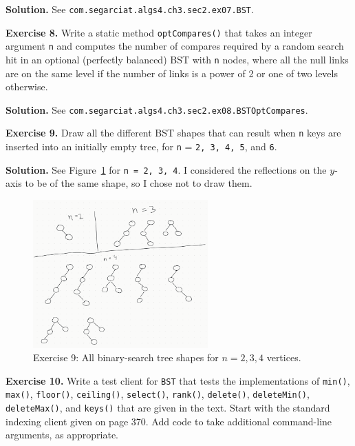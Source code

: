 \documentclass[12pt, a4paper]{article}
\newenvironment{ex}[2][Exercise]
{\par\medskip\noindent \textbf{#1 #2.}}
{\medskip}
\newenvironment{sol}[1][Solution]
{\par\medskip\noindent \textbf{#1.} }
{\medskip}
\begin{document}
	\begin{sol}
		See \texttt{com.segarciat.algs4.ch3.sec2.ex07.BST}.
	\end{sol}
	\begin{ex}{8}
		Write a static method \texttt{optCompares()} that takes an integer argument \texttt{n}
		and computes the number of compares required by a random search hit in an optional
		(perfectly balanced) BST with \texttt{n} nodes, where all the null links are on the
		same level if the number of links is a power of 2 or one of two levels otherwise.
	\end{ex}
	\begin{sol}
		See \texttt{com.segarciat.algs4.ch3.sec2.ex08.BSTOptCompares}.
	\end{sol}
	\begin{ex}{9}
		Draw all the different BST shapes that can result when \texttt{n} keys are inserted
		into an initially empty tree, for \texttt{n} = \texttt{2, 3, 4, 5}, and \texttt{6}.
	\end{ex}
	\begin{sol}
		See Figure~\ref{fig:ex-09} for \texttt{n = 2, 3, 4}. I considered the reflections
		on the $y$-axis to be of the same shape, so I chose not to draw them.
		\begin{figure}
			\centering
			\includegraphics[width=0.6\textwidth]{exercise-09}
			\caption{Exercise 9: All binary-search tree shapes for $n=2,3,4$ vertices.}
			\label{fig:ex-09}
		\end{figure}
	\end{sol}
	\begin{ex}{10}
		Write a test client for \texttt{BST} that tests the implementations of \texttt{min()},
		\texttt{max()}, \texttt{floor()}, \texttt{ceiling()}, \texttt{select()}, \texttt{rank()},
		\texttt{delete()}, \texttt{deleteMin()}, \texttt{deleteMax()}, and \texttt{keys()} that
		are given in the text. Start with the standard indexing client given on page 370.
		Add code to take additional command-line arguments, as appropriate.
	\end{ex}
\end{document}

